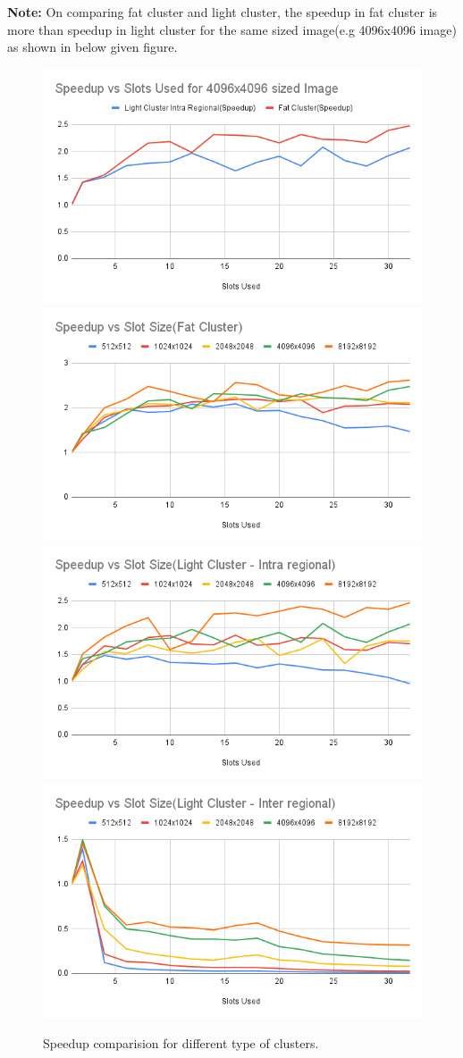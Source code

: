 \documentclass{article}
\begin{document}
\textbf{Note:} On comparing fat cluster and light cluster, the speedup in fat cluster is more than speedup in light cluster for the same sized image(e.g 4096x4096 image) as shown in below given figure.
\newpage
\begin{figure}[hb]
    \includegraphics[width=.48\textwidth]{Speedup vs Slots Used for 4096x4096 sized Image.png}\hfill
    \label{Fast Cluster vs Light Cluster Speedup}
    \includegraphics[width=.48\textwidth]{Speedup vs Slot Size(Fat Cluster).png}
    \\[\smallskipamount]
    \centering
    \includegraphics[width=.48\textwidth]{Speedup vs Slot Size(Light Cluster - Intra regional).png}\hfill
    \includegraphics[width=.48\textwidth]{Speedup vs Slot Size(Light Cluster - Inter regional).png}
    \caption{Speedup comparision for different type of clusters.}
    \label{fig:Weak Scalability(Intra)}
\end{figure}
\newpage
\end{document}
